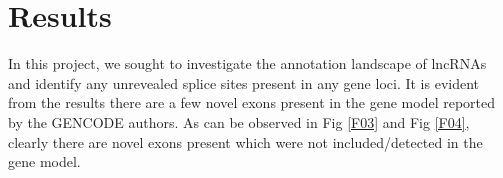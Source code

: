 \documentclass[ncrna,article,submit,moreauthors,pdftex,10pt,a4paper]{mdpi}
\begin{document}
\section{Results}

In this project, we sought to investigate the annotation landscape of lncRNAs and identify any unrevealed splice sites present
in any gene loci.
It is evident from the results there are a few novel exons present in the gene model reported by the GENCODE authors. As can be observed in
Fig \ref{F03} and Fig \ref{F04}, clearly there are novel exons present which were not included/detected in the gene model.
\begin{figure}[h]
\end{figure}
\end{document}
